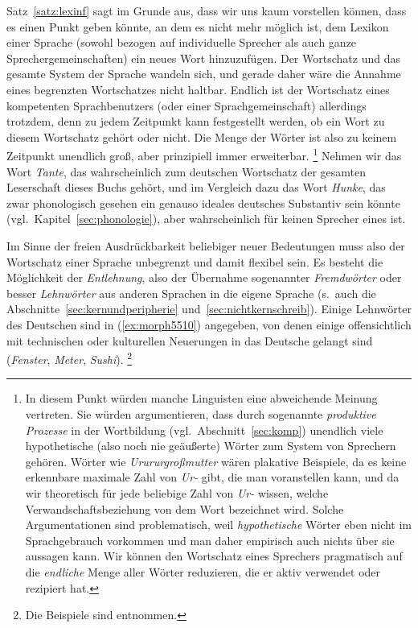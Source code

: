 
Satz~\ref{satz:lexinf} sagt im Grunde aus, dass wir uns kaum vorstellen können, dass es einen Punkt geben könnte, an dem es nicht mehr möglich ist, dem Lexikon einer Sprache (sowohl bezogen auf individuelle Sprecher als auch ganze Sprechergemeinschaften) ein neues Wort hinzuzufügen.
Der Wortschatz und das gesamte System der Sprache wandeln sich, und gerade daher wäre die Annahme eines begrenzten Wortschatzes nicht haltbar.
Endlich ist der Wortschatz eines kompetenten Sprachbenutzers (oder einer Sprachgemeinschaft) allerdings trotzdem, denn zu jedem Zeitpunkt kann festgestellt werden, ob ein Wort zu diesem Wortschatz gehört oder nicht.
Die Menge der Wörter ist also zu keinem Zeitpunkt unendlich groß, aber prinzipiell immer erweiterbar.%
\footnote{In diesem Punkt würden manche Linguisten eine abweichende Meinung vertreten.
Sie würden argumentieren, dass durch sogenannte \textit{produktive Prozesse} in der Wortbildung (vgl.\ Abschnitt~\ref{sec:komp}) unendlich viele hypothetische (also noch nie geäußerte) Wörter zum System von Sprechern gehören.
Wörter wie \textit{Urururgroßmutter} wären plakative Beispiele, da es keine erkennbare maximale Zahl von \textit{Ur-} gibt, die man voranstellen kann, und da wir theoretisch für jede beliebige Zahl von \textit{Ur-} wissen, welche Verwandschaftsbeziehung von dem Wort bezeichnet wird.
Solche Argumentationen sind problematisch, weil \textit{hypothetische} Wörter eben nicht im Sprachgebrauch vorkommen und man daher empirisch auch nichts über sie aussagen kann.
Wir können den Wortschatz eines Sprechers pragmatisch auf die \textit{endliche} Menge aller Wörter reduzieren, die er aktiv verwendet oder rezipiert hat.}
Nehmen wir das Wort \textit{Tante}, das wahrscheinlich zum deutschen Wortschatz der gesamten Leserschaft dieses Buchs gehört, und im Vergleich dazu das Wort \textit{Hunke}, das zwar phonologisch gesehen ein genauso ideales deutsches Substantiv sein könnte (vgl.\ Kapitel~\ref{sec:phonologie}), aber wahrscheinlich für keinen Sprecher eines ist.

Im Sinne der freien Ausdrückbarkeit beliebiger neuer Bedeutungen muss also der Wortschatz einer Sprache unbegrenzt und damit flexibel sein.
Es besteht die Möglichkeit der \textit{Entlehnung}, also der Übernahme sogenannter \textit{Fremdwörter} oder besser \textit{Lehnwörter} aus anderen Sprachen in die eigene Sprache (s.\ auch die Abschnitte~\ref{sec:kernundperipherie} und~\ref{sec:nichtkernschreib}).
Einige Lehnwörter des Deutschen sind in (\ref{ex:morph5510}) angegeben, von denen einige offensichtlich mit technischen oder kulturellen Neuerungen in das Deutsche gelangt sind (\textit{Fenster}, \textit{Meter}, \textit{Sushi}).%
\footnote{Die Beispiele sind \citet{Kluge2002} entnommen.}

